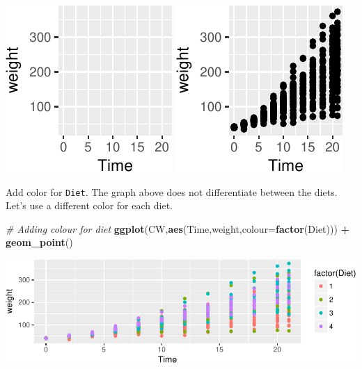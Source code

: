 \documentclass[]{book}
\newenvironment{Shaded}{\begin{snugshade}}{\end{snugshade}}
\newcommand{\CommentTok}[1]{\textcolor[rgb]{0.56,0.35,0.01}{\textit{#1}}}
\newcommand{\DataTypeTok}[1]{\textcolor[rgb]{0.13,0.29,0.53}{#1}}
\newcommand{\KeywordTok}[1]{\textcolor[rgb]{0.13,0.29,0.53}{\textbf{#1}}}
\newcommand{\NormalTok}[1]{#1}
\newcommand{\OperatorTok}[1]{\textcolor[rgb]{0.81,0.36,0.00}{\textbf{#1}}}
\newcommand{\StringTok}[1]{\textcolor[rgb]{0.31,0.60,0.02}{#1}}
\theoremstyle{definition}
\theoremstyle{definition}
\theoremstyle{definition}
\theoremstyle{remark}
\begin{document}
\begin{center}\includegraphics{01-Introduction-to-R_files/figure-latex/emptyPlot-1} \includegraphics{01-Introduction-to-R_files/figure-latex/emptyPlot-2} \end{center}

Add color for \texttt{Diet}. The graph above does not differentiate between the diets. Let's use a different color for
each diet.

\begin{Shaded}
\begin{Highlighting}[]
\CommentTok{# Adding colour for diet}
\KeywordTok{ggplot}\NormalTok{(CW,}\KeywordTok{aes}\NormalTok{(Time,weight,}\DataTypeTok{colour=}\KeywordTok{factor}\NormalTok{(Diet))) }\OperatorTok{+}
\StringTok{  }\KeywordTok{geom_point}\NormalTok{() }
\end{Highlighting}
\end{Shaded}

\includegraphics{01-Introduction-to-R_files/figure-latex/addColourPlot-1.pdf}
\end{document}
